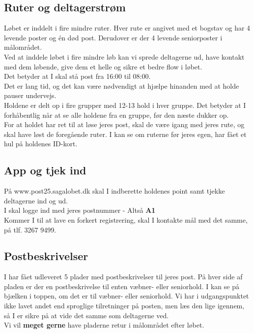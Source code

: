 \subsection{Ruter og deltagerstrøm}
Løbet er inddelt i fire mindre ruter. Hver rute er angivet med et bogstav og har 4 levende poster og én død post. Derudover er der 4 levende seniorposter i målområdet.\\
Ved at inddele løbet i fire mindre løb kan vi sprede deltagerne ud, have kontakt med dem løbende, give dem et helle og sikre et bedre flow i løbet.\\
\newline
Det betyder at I skal stå post fra 16:00 til 08:00.\\
Det er lang tid, og det kan være nødvendigt at hjælpe hinanden med at holde pauser undervejs.\\
\newline
Holdene er delt op i fire grupper med 12-13 hold i hver gruppe. Det betyder at I forhåbentlig når at se alle holdene fra en gruppe, før den næste dukker op.\\
For at holdet har ret til at løse jeres post, skal de være igang med jeres rute, og skal have løst de foregående ruter. I kan se om ruterne før jeres egen, har fået et hul på holdenes ID-kort.
\subsection{App og tjek ind}
På www.post25.sagalobet.dk skal I indberette holdenes point samt tjekke deltagerne ind og ud.\\
I skal logge ind med jeres postnummer - Altså \textbf{A1}\\
\newline
Kommer I til at lave en forkert registrering, skal I kontakte mål med det samme, på tlf. 3267 9499.
\newpage
\vspace*{.4cm}
\subsection{Postbeskrivelser}
I har fået udleveret 5 plader med postbeskrivelser til jeres post. På hver side af pladen er der en postbeskrivelse til enten væbner- eller seniorhold. I kan se på bjælken i toppen, om det er til væbner- eller seniorhold. Vi har i udgangspunktet ikke lavet andet end sproglige tilretninger på posten, men læs den lige igennem, så I er sikre på at vide det samme som deltagerne ved.\\
Vi vil \textbf{meget gerne} have pladerne retur i målområdet efter løbet.
